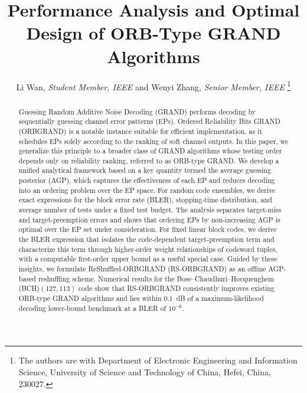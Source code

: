 \documentclass[letterpaper,draftclsnofoot,onecolumn]{IEEEtran}
\begin{document}
\title{Performance Analysis and Optimal Design of ORB-Type GRAND Algorithms}

\author{Li Wan, {\it Student Member, IEEE} and Wenyi Zhang, {\it Senior Member, IEEE}
\thanks{The authors are with Department of Electronic Engineering and Information Science, University of Science and Technology of China, Hefei, China, 230027.}%
}



\maketitle

\begin{abstract}
    Guessing Random Additive Noise Decoding (GRAND) performs decoding by sequentially guessing channel error patterns (EPs). Ordered Reliability Bits GRAND (ORBGRAND) is a notable instance suitable for efficient implementation, as it schedules EPs solely according to the ranking of soft channel outputs.
    In this paper, we generalize this principle to a broader class of GRAND algorithms whose testing order depends only on reliability ranking, referred to as ORB-type GRAND. We develop a unified analytical framework based on a key quantity termed the average guessing posterior (AGP), which captures the effectiveness of each EP and reduces decoding into an ordering problem over the EP space.
    For random code ensembles, we derive exact expressions for the block error rate (BLER), stopping-time distribution, and average number of tests under a fixed test budget. The analysis separates target-miss and target-preemption errors and shows that ordering EPs by non-increasing AGP is optimal over the EP set under consideration.
    For fixed linear block codes, we derive the BLER expression that isolates the code-dependent target-preemption term and characterize this term through higher-order weight relationships of codeword tuples, with a computable first-order upper bound as a useful special case.
    Guided by these insights, we formulate ReShuffled-ORBGRAND (RS-ORBGRAND) as an offline AGP-based reshuffling scheme. Numerical results for the Bose--Chaudhuri--Hocquenghem (BCH)$(127,113)$ code show that RS-ORBGRAND consistently improves existing ORB-type GRAND algorithms and lies within $0.1$~dB of a maximum-likelihood decoding lower-bound benchmark at a BLER of $10^{-6}$.
\end{abstract}
\end{document}
